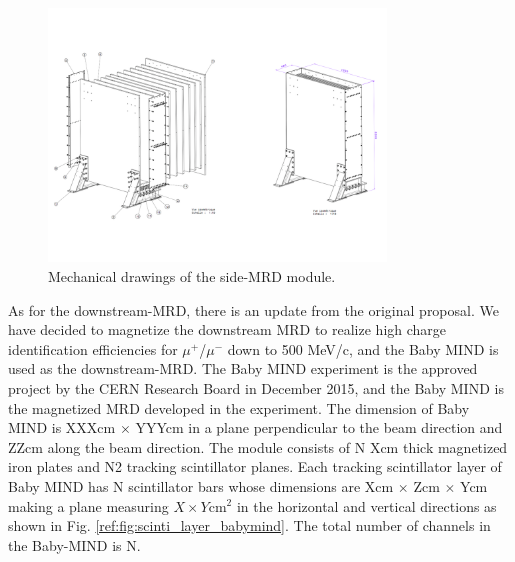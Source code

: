 \begin{figure}%
  \begin{center}
  \includegraphics[width=0.8\textwidth]{figs/mec_drawing_side_mrd.pdf}
  \caption{Mechanical drawings of the side-MRD module.}
  \label{fig:med_drawing_side_mrd}
  \end{center}
\end{figure}


As for the downstream-MRD, there is an update from the original proposal.
We have decided to magnetize the downstream MRD to realize high charge identification efficiencies for $\mu^{+}$/$\mu^{-}$ down to 500 MeV/c,
and the Baby MIND\cite{BabyMIND} is used as the downstream-MRD.
The Baby MIND experiment is the approved project by the CERN Research Board in December 2015,
and the Baby MIND is the magnetized MRD developed in the experiment.
The dimension of Baby MIND is XXXcm $\times$ YYYcm 
in a plane perpendicular to the beam direction and ZZcm along the beam direction.
The module consists of N Xcm thick magnetized iron plates and N2 tracking scintillator planes.
Each tracking scintillator layer of Baby MIND has N scintillator bars whose dimensions are
Xcm $\times$ Zcm $\times$ Ycm making a plane measuring $X \times Y$cm$^{2}$
in the horizontal and vertical directions as shown in Fig. \ref{ref:fig:scinti_layer_babymind}.
The total number of channels in the Baby-MIND is N.

